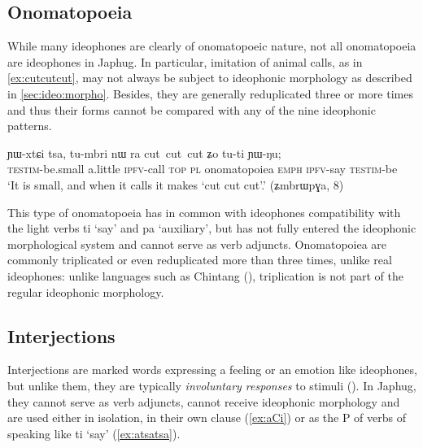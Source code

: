\documentclass[oldfontcommands,oneside,a4paper,11pt]{article}
\newcommand{\ipa}[1]{{\phon \mbox{#1}}} %
\begin{document}
 \subsection{Onomatopoeia}
While many ideophones are clearly of onomatopoeic nature, not all onomatopoeia are ideophones in Japhug. In particular, imitation of animal calls, as in \ref{ex:cutcutcut}, may not always be subject  to  ideophonic morphology as described in \ref{sec:ideo:morpho}. Besides, they are generally reduplicated three or more times and thus their forms cannot be compared with any of the nine ideophonic patterns.

     \begin{exe}
\ex \label{ex:cutcutcut}
\gll 
 	\ipa{ɲɯ-xtɕi} 	\ipa{tsa,} 	\ipa{tu-mbri} 	\ipa{nɯ} \ipa{ra} 	\ipa{cut cut cut} \ipa{ʑo} 	\ipa{tu-ti} 	\ipa{ɲɯ-ŋu;} \\
\textsc{testim}-be.small a.little \textsc{ipfv}-call \textsc{top} \textsc{pl} onomatopoiea \textsc{emph} \textsc{ipfv}-say \textsc{testim}-be \\
\glt  `It is small, and when it calls it makes `cut cut cut'.' (ʑmbrɯpɣa, 8)
\end{exe}
 
 This type of onomatopoeia has in common with   ideophones   compatibility with the light verbs \ipa{ti} `say' and \ipa{pa} `auxiliary', but has not fully entered the ideophonic morphological system and cannot serve as verb adjuncts. Onomatopoiea are commonly triplicated or even reduplicated more than three times, unlike real ideophones:  unlike languages such as Chintang (\citealt{rai06triplication}), triplication is not part of the regular ideophonic morphology.
 
 \subsection{Interjections}
 
 Interjections are marked words   expressing a feeling or an emotion   like ideophones, but unlike them, they are typically \textit{involuntary responses} to stimuli   (\citealt{dingemanse11phd}). In Japhug, they cannot serve as verb adjuncts, cannot receive ideophonic morphology and are used either in isolation, in their own clause (\ref{ex:aCi}) or as the P of verbs of speaking like \ipa{ti} `say' (\ref{ex:atsatsa}). 
\end{document}
